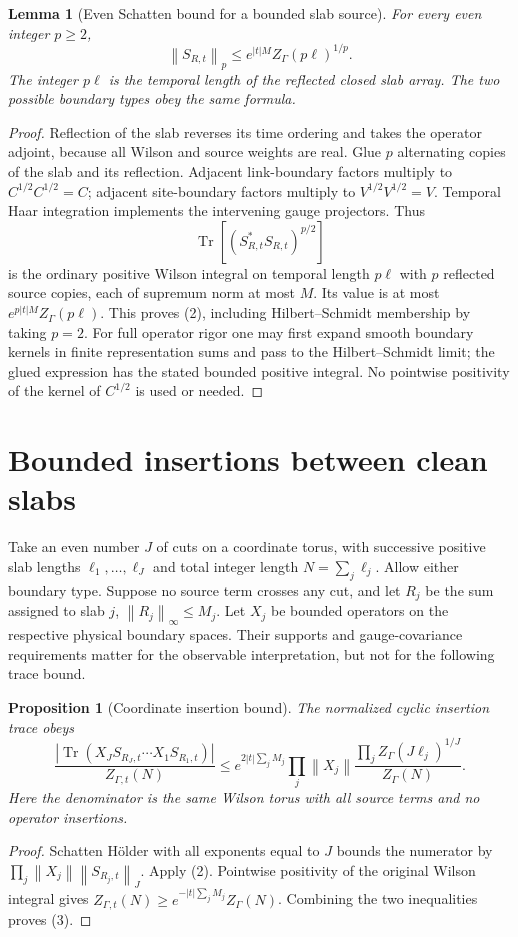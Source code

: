 \documentclass[11pt]{article}
\newtheorem{lemma}{Lemma}
\newtheorem{proposition}{Proposition}
\newcommand{\tr}{\operatorname{Tr}}
\newcommand{\norm}[1]{\left\|#1\right\|}
\begin{document}
\begin{lemma}[Even Schatten bound for a bounded slab source]
For every even integer $p\geq2$,
\[
 \norm{S_{R,t}}_p
 \leq e^{|t|M} Z_\Gamma(p\ell)^{1/p}.
 \tag{2}
\]
The integer $p\ell$ is the temporal length of the reflected closed slab
array. The two possible boundary types obey the same formula.
\end{lemma}
\begin{proof}
Reflection of the slab reverses its time ordering and takes the
operator adjoint, because all Wilson and source weights are real.
Glue $p$ alternating copies of the slab and its reflection. Adjacent
link-boundary factors multiply to $C^{1/2}C^{1/2}=C$; adjacent
site-boundary factors multiply to $V^{1/2}V^{1/2}=V$.
Temporal Haar integration implements the intervening gauge projectors.
Thus
\[
 \tr[(S_{R,t}^*S_{R,t})^{p/2}]
\]
is the ordinary positive Wilson integral on temporal length $p\ell$
with $p$ reflected source copies, each of supremum norm at most $M$.
Its value is at most $e^{p|t|M}Z_\Gamma(p\ell)$.
This proves (2), including Hilbert--Schmidt membership by taking $p=2$.
For full operator rigor one may first expand smooth boundary kernels
in finite representation sums and pass to the Hilbert--Schmidt limit;
the glued expression has the stated bounded positive integral.
No pointwise positivity of the kernel of $C^{1/2}$ is used or needed.
\end{proof}

\section{Bounded insertions between clean slabs}

Take an even number $J$ of cuts on a coordinate torus, with successive
positive slab lengths $\ell_1,\ldots,\ell_J$ and total integer length
$N=\sum_j\ell_j$. Allow either boundary type. Suppose no source term
crosses any cut, and let $R_j$ be the sum assigned to slab $j$,
$\norm{R_j}_\infty\leq M_j$.
Let $X_j$ be bounded operators on the respective physical boundary
spaces. Their supports and gauge-covariance requirements matter for
the observable interpretation, but not for the following trace bound.

\begin{proposition}[Coordinate insertion bound]
The normalized cyclic insertion trace obeys
\[
 \frac{\left|\tr(X_J S_{R_J,t}\cdots X_1S_{R_1,t})\right|}
 {Z_{\Gamma,t}(N)}
 \leq e^{2|t|\sum_jM_j}\prod_j\norm{X_j}
 \frac{\prod_j Z_\Gamma(J\ell_j)^{1/J}}{Z_\Gamma(N)}.
 \tag{3}
\]
Here the denominator is the same Wilson torus with all source terms
and no operator insertions.
\end{proposition}
\begin{proof}
Schatten H\"older with all exponents equal to $J$ bounds the numerator
by $\prod_j\norm{X_j}\norm{S_{R_j,t}}_J$.
Apply (2). Pointwise positivity of the original Wilson integral gives
$Z_{\Gamma,t}(N)\geq e^{-|t|\sum_jM_j}Z_\Gamma(N)$.
Combining the two inequalities proves (3).
\end{proof}
\end{document}

